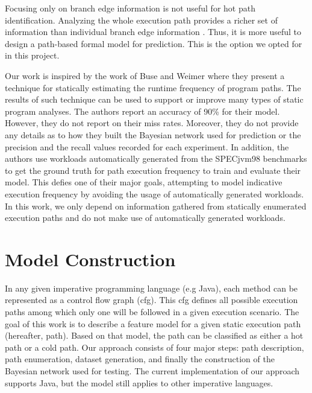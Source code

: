 \documentclass[10pt,twocolumn,letterpaper]{article}
\begin{document}
Focusing only on branch edge information is not useful for hot path identification. Analyzing the whole execution path provides a richer set of information
than individual branch edge information \cite{buse2009road}. Thus, it is more useful to design a path-based formal model for prediction. This is the option we
opted for in this project.

Our work is inspired by the work of Buse and Weimer \cite{buse2009road} where they present a technique for statically estimating the runtime frequency of
program paths. The results of such technique can be used to support or improve many types of static program analyses. The authors report an accuracy of 90\%
for their model. However, they do not report on their miss rates. Moreover, they do not provide any details as to how they built the Bayesian network used for
prediction or the precision and the recall values recorded for each experiment. In addition, the authors use workloads automatically generated from the
SPECjvm98 benchmarks \cite{specjvm98} to get the ground truth for path execution frequency to train and evaluate their model. This defies one of their major
goals, attempting to model indicative execution frequency by avoiding the usage of automatically generated workloads. In this work, we only depend on
information gathered from statically enumerated execution paths and do not make use of automatically generated workloads.

\section{Model Construction}
\label{sec:implementation}
In any given imperative programming language (e.g Java), each method can be represented as a control flow graph (cfg). This cfg defines all possible execution
paths among which only one will be followed in a given execution scenario. The goal of this work is to describe a feature model for a given static execution
path (hereafter, path). Based on that model, the path can be classified as either a hot path or a cold path. Our approach consists of four major steps: path
description, path enumeration, dataset generation, and finally the construction of the Bayesian network used for testing. The current implementation of our
approach supports Java, but the model still applies to other imperative languages.
\end{document}
